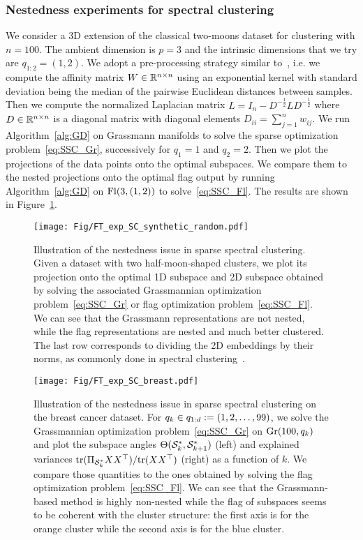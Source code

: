 \subsubsection{Nestedness experiments for spectral clustering}
We consider a 3D extension of the classical two-moons dataset for clustering with $n=100$.
The ambient dimension is $p = 3$ and the intrinsic dimensions that we try are $q_{1:2} = (1, 2)$.
We adopt a pre-processing strategy similar to~\citet{lu_convex_2016,wang_grassmannian_2017}, i.e. we compute the affinity matrix $W\in\R^{n \times n}$ using an exponential kernel with standard deviation being the median of the pairwise Euclidean distances between samples. Then we compute the normalized Laplacian matrix $L = I_n - D^{-\frac12} L D^{-\frac12}$ where $D\in\R^{n \times n}$ is a diagonal matrix with diagonal elements $D_{ii} = \sum_{j=1}^n w_{ij}$.
We run Algorithm~\ref{alg:GD} on Grassmann manifolds to solve the sparse optimization problem~\eqref{eq:SSC_Gr}, successively for $q_1 = 1$ and $q_2 = 2$. Then we plot the projections of the data points onto the optimal subspaces. We compare them to the nested projections onto the optimal flag output by running Algorithm~\ref{alg:GD} on $\Fl(3, (1, 2))$ to solve~\eqref{eq:SSC_Fl}. The results are shown in Figure~\ref{fig:SSC_nested}.
\begin{figure}
	\centering
    \texttt{[image: Fig/FT\_exp\_SC\_synthetic\_random.pdf]}
    \caption{
    Illustration of the nestedness issue in sparse spectral clustering. Given a dataset with two half-moon-shaped clusters, we plot its projection onto the optimal 1D subspace and 2D subspace obtained by solving the associated Grassmannian optimization problem~\eqref{eq:SSC_Gr} or flag optimization problem~\eqref{eq:SSC_Fl}. 
    We can see that the Grassmann representations are not nested, while the flag representations are nested and much better clustered. 
    The last row corresponds to dividing the 2D embeddings by their norms, as commonly done in spectral clustering~\citep{ng_spectral_2001}.}
	\label{fig:SSC_nested}
\end{figure}
\begin{figure}
	\centering
    \texttt{[image: Fig/FT\_exp\_SC\_breast.pdf]}
    \caption{
    Illustration of the nestedness issue in sparse spectral clustering on the breast cancer dataset. For $q_k \in \qf := (1, 2, \dots, 99)$, we solve the Grassmannian optimization problem~\eqref{eq:SSC_Gr} on $\Gr(100, q_k)$ and plot the subspace angles $\Theta(\S_k^*, \S_{k+1}^*)$ (left) and explained variances ${\operatorname{tr}(\Pi_{\S_k^*} X X\T)} / {\operatorname{tr}(X X\T)}$ (right) as a function of $k$. We compare those quantities to the ones obtained by solving the flag optimization problem~\eqref{eq:SSC_Fl}. 
    We can see that the Grassmann-based method is highly non-nested while the flag of subspaces seems to be coherent with the cluster structure: the first axis is for the orange cluster while the second axis is for the blue cluster.
    }
    \label{fig:SC_nested}
\end{figure}
